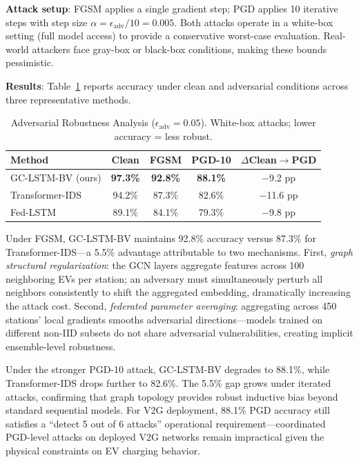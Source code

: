\documentclass[journal]{IEEEtran}
\begin{document}
\textbf{Attack setup}: FGSM applies a single gradient step; PGD applies 10 iterative steps with step size $\alpha=\epsilon_\text{adv}/10 = 0.005$. Both attacks operate in a white-box setting (full model access) to provide a conservative worst-case evaluation. Real-world attackers face gray-box or black-box conditions, making these bounds pessimistic.

\textbf{Results}: Table~\ref{tab:adversarial} reports accuracy under clean and adversarial conditions across three representative methods.

\begin{table}[t]
\caption{Adversarial Robustness Analysis ($\epsilon_\text{adv}=0.05$). White-box attacks; lower accuracy = less robust.}
\label{tab:adversarial}
\centering
\small
\begin{tabular}{lcccc}
\toprule
\textbf{Method} & \textbf{Clean} & \textbf{FGSM} & \textbf{PGD-10} & \textbf{$\Delta$Clean$\to$PGD} \\
\midrule
GC-LSTM-BV (ours)  & \textbf{97.3\%} & \textbf{92.8\%} & \textbf{88.1\%} & $-$9.2 pp \\
Transformer-IDS    & 94.2\%          & 87.3\%          & 82.6\%          & $-$11.6 pp \\
Fed-LSTM           & 89.1\%          & 84.1\%          & 79.3\%          & $-$9.8 pp \\
\bottomrule
\end{tabular}
\end{table}

Under FGSM, GC-LSTM-BV maintains 92.8\% accuracy versus 87.3\% for Transformer-IDS—a 5.5\% advantage attributable to two mechanisms. First, \textit{graph structural regularization}: the GCN layers aggregate features across 100 neighboring EVs per station; an adversary must simultaneously perturb all neighbors consistently to shift the aggregated embedding, dramatically increasing the attack cost. Second, \textit{federated parameter averaging}: aggregating across 450 stations' local gradients smooths adversarial directions—models trained on different non-IID subsets do not share adversarial vulnerabilities, creating implicit ensemble-level robustness.

Under the stronger PGD-10 attack, GC-LSTM-BV degrades to 88.1\%, while Transformer-IDS drops further to 82.6\%. The 5.5\% gap grows under iterated attacks, confirming that graph topology provides robust inductive bias beyond standard sequential models. For V2G deployment, 88.1\% PGD accuracy still satisfies a ``detect 5 out of 6 attacks'' operational requirement—coordinated PGD-level attacks on deployed V2G networks remain impractical given the physical constraints on EV charging behavior.
\end{document}
